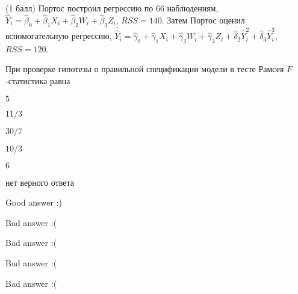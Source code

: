 
\begin{question}
(1 балл) Портос построил регрессию по 66 наблюдениям,
\(\hat Y_i = \hat\beta_0 + \hat\beta_1 X_i + \hat\beta_2 W_i + \hat\beta_3 Z_i\),
\(RSS=140\). Затем Портос оценил вспомогательную регрессию,
\(\hat{\hat {Y}}_i = \hat\gamma_0 + \hat\gamma_1 X_i + \hat\gamma_2 W_i + \hat\gamma_3 Z_i + \hat\delta_2 \hat Y_i^2 + \hat\delta_3 \hat Y_i^3\),
\(RSS=120\).

При проверке гипотезы о правильной спецификации модели в тесте Рамсея
\(F\)-статистика равна
\begin{answerlist}
  \item \(5\)
  \item \(11/3\)
  \item \(30/7\)
  \item \(10/3\)
  \item \(6\)
  \item нет верного ответа
\end{answerlist}
\end{question}

\begin{solution}
\begin{answerlist}
  \item Good answer :)
  \item Bad answer :(
  \item Bad answer :(
  \item Bad answer :(
  \item Bad answer :(
\end{answerlist}
\end{solution}
